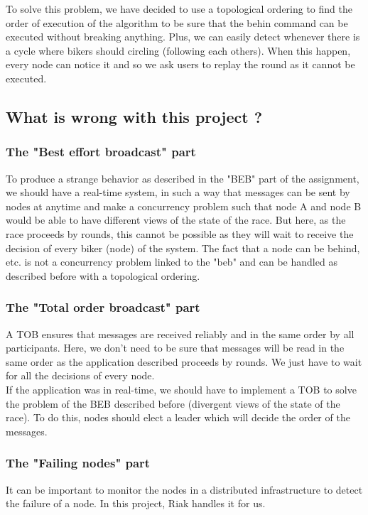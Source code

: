 \documentclass[a4paper, 11pt]{article}
\begin{document}
To solve this problem, we have decided to use a topological ordering to find the order of execution of the algorithm to be sure that the behin command can be executed without breaking anything. Plus, we can easily detect whenever there is a cycle where bikers should circling (following each others). When this happen, every node can notice it and so we ask users to replay the round as it cannot be executed. \\

\subsection{What is wrong with this project ?}

\subsubsection{The "Best effort broadcast" part}
To produce a strange behavior as described in the "BEB" part of the assignment, we should have a real-time system, in such a way that messages can be sent by nodes at anytime and make a concurrency problem such that node A and node B would be able to have different views of the state of the race.
But here, as the race proceeds by rounds, this cannot be possible as they will wait to receive the decision of every biker (node) of the system.
The fact that a node can be behind, etc. is not a concurrency problem linked to the "beb" and can be handled as described before with a topological ordering.

\subsubsection{The "Total order broadcast" part}
A TOB ensures that messages are received reliably and in the same order by all participants.
Here, we don't need to be sure that messages will be read in the same order as the application described proceeds by rounds.
We just have to wait for all the decisions of every node. \\

If the application was in real-time, we should have to implement a TOB to solve the problem of the BEB described before (divergent views of the state of the race).
To do this, nodes should elect a leader which will decide the order of the messages.

\subsubsection{The "Failing nodes" part}
It can be important to monitor the nodes in a distributed infrastructure to detect the failure of a node.
In this project, Riak handles it for us. \\
\end{document}
